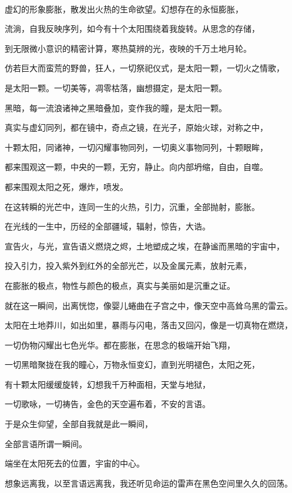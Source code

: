\documentclass[UTF8]{article}
\begin{document}
\\[0.6cm]
\par 虚幻的形象膨胀，散发出火热的生命欲望。幻想存在的永恒膨胀，
\par 流淌，自我反映序列，如今有十个太阳围绕着我旋转。从思念的存储，
\par 到无限微小意识的精密计算，寒热莫辨的光，夜映的千万土地月轮。
\par 仿若巨大而蛮荒的野兽，狂人，一切祭祀仪式，是太阳一颗，一切火之情歌，
\par 是太阳一颗。一切美等，凋零枯落，幽想摄定，是太阳一颗。
\par 黑暗，每一流浪诸神之黑暗叠加，变作我的瞳，是太阳一颗。
\par 真实与虚幻同列，都在镜中，奇点之镜，在光子，原始火球，对称之中，
\par 十颗太阳，同诸神，一切闪耀事物同列，一切奥义事物同列，十颗眼眸，
\par 都来围观这一颗，中央的一颗，无穷，静止。向内部坍缩，自由，自噬。
\par 都来围观太阳之死，爆炸，喷发。
\par 在这转瞬的光芒中，连同一生的火热，引力，沉重，全部抛射，膨胀。
\par 在光线的一生中，历经的全部疆域，辐射，惊告，大诰。
\par 宣告火，与光，宣告语义燃烧之烬，土地塑成之埃，在静谧而黑暗的宇宙中，
\par 投入引力，投入紫外到红外的全部光芒，以及金属元素，放射元素，
\par 在膨胀的极点，物性与颜色的极点，真实与美丽如是沉重之证。
\par 就在这一瞬间，出离恍惚，像婴儿蜷曲在子宫之中，像天空中高耸乌黑的雷云。
\par 太阳在土地莽川，如出如里，暴雨与闪电，落击又回闪，像是一切真物在燃烧，
\par 一切伪物闪耀出七色光华。都在膨胀，在思念的极端开始飞翔，
\par 一切黑暗聚拢在我的瞳心，万物永恒变幻，直到光明褪色，太阳之死，
\par 有十颗太阳缓缓旋转，幻想我千万种面相，天堂与地狱，
\par 一切歌咏，一切祷告，金色的天空遍布着，不安的言语。
\par 于是众生仰望，全部自我就是此一瞬间，
\par 全部言语所谓一瞬间。
\\[0.6cm]
\par 端坐在太阳死去的位置，宇宙的中心。
\par 想象远离我，以至言语远离我，我还听见命运的雷声在黑色空间里久久的回荡。
\end{document}
